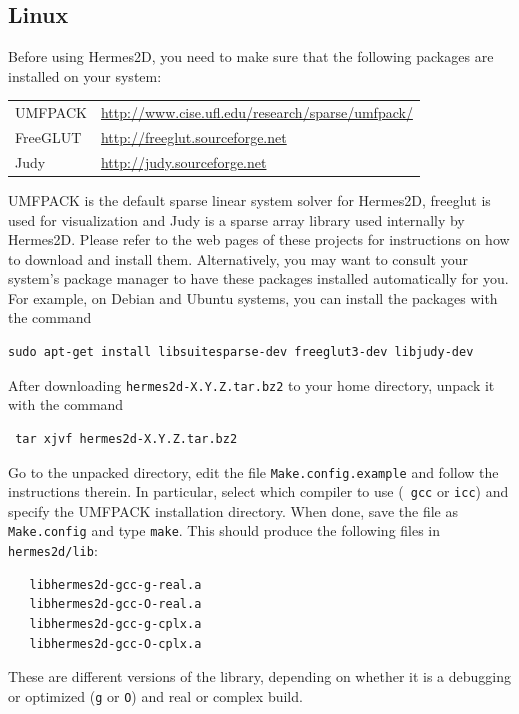 
\subsection{Linux}

\lstset{language=make}

Before using Hermes2D, you need to make sure that the following packages are installed
on your system:

\begin{center}
\begin{tabular}{ll}
  UMFPACK & \url{http://www.cise.ufl.edu/research/sparse/umfpack/} \\
  FreeGLUT & \url{http://freeglut.sourceforge.net} \\
  Judy & \url{http://judy.sourceforge.net}
\end{tabular}
\end{center}

UMFPACK is the default sparse linear system solver for Hermes2D,
freeglut is  used for visualization and Judy is a sparse array library
used internally by Hermes2D. Please refer to the web pages of these projects for
instructions on how to download and install them. Alternatively, you may want to
consult your system's package manager to have these packages
installed automatically for you. For example, on Debian and Ubuntu systems, you
can install the packages with the command 
\begin{lstlisting}
sudo apt-get install libsuitesparse-dev freeglut3-dev libjudy-dev
\end{lstlisting}

After downloading \verb"hermes2d-X.Y.Z.tar.bz2" to your home directory, unpack it with 
the command
\begin{lstlisting}
 tar xjvf hermes2d-X.Y.Z.tar.bz2
\end{lstlisting}

Go to the unpacked directory, edit the file \verb"Make.config.example" and
follow the instructions therein. In particular, select which compiler to use ({\tt
gcc} or {\tt icc}) and specify the UMFPACK installation directory. When done,
save the file as {\tt Make.config} and type {\tt make}. This should
produce the following files in {\tt hermes2d/lib}:
{\small\begin{verbatim}
   libhermes2d-gcc-g-real.a
   libhermes2d-gcc-O-real.a
   libhermes2d-gcc-g-cplx.a
   libhermes2d-gcc-O-cplx.a
\end{verbatim}}
These are different versions of the library, depending on whether it is a debugging
or optimized ({\tt g} or {\tt O}) and real or complex build. 

